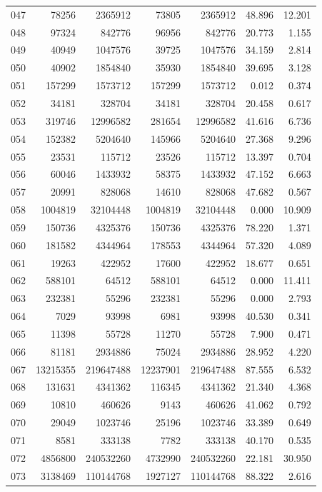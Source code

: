 \begin{longtable}{lrrrrrr}
047 & 78256 & 2365912 & 73805 & 2365912 & 48.896 & 12.201\\
048 & 97324 & 842776 & 96956 & 842776 & 20.773 & 1.155\\
049 & 40949 & 1047576 & 39725 & 1047576 & 34.159 & 2.814\\
050 & 40902 & 1854840 & 35930 & 1854840 & 39.695 & 3.128\\
051 & 157299 & 1573712 & 157299 & 1573712 & 0.012 & 0.374\\
052 & 34181 & 328704 & 34181 & 328704 & 20.458 & 0.617\\
053 & 319746 & 12996582 & 281654 & 12996582 & 41.616 & 6.736\\
054 & 152382 & 5204640 & 145966 & 5204640 & 27.368 & 9.296\\
055 & 23531 & 115712 & 23526 & 115712 & 13.397 & 0.704\\
056 & 60046 & 1433932 & 58375 & 1433932 & 47.152 & 6.663\\
057 & 20991 & 828068 & 14610 & 828068 & 47.682 & 0.567\\
058 & 1004819 & 32104448 & 1004819 & 32104448 & 0.000 & 10.909\\
059 & 150736 & 4325376 & 150736 & 4325376 & 78.220 & 1.371\\
060 & 181582 & 4344964 & 178553 & 4344964 & 57.320 & 4.089\\
061 & 19263 & 422952 & 17600 & 422952 & 18.677 & 0.651\\
062 & 588101 & 64512 & 588101 & 64512 & 0.000 & 11.411\\
063 & 232381 & 55296 & 232381 & 55296 & 0.000 & 2.793\\
064 & 7029 & 93998 & 6981 & 93998 & 40.530 & 0.341\\
065 & 11398 & 55728 & 11270 & 55728 & 7.900 & 0.471\\
066 & 81181 & 2934886 & 75024 & 2934886 & 28.952 & 4.220\\
067 & 13215355 & 219647488 & 12237901 & 219647488 & 87.555 & 6.532\\
068 & 131631 & 4341362 & 116345 & 4341362 & 21.340 & 4.368\\
069 & 10810 & 460626 & 9143 & 460626 & 41.062 & 0.792\\
070 & 29049 & 1023746 & 25196 & 1023746 & 33.389 & 0.649\\
071 & 8581 & 333138 & 7782 & 333138 & 40.170 & 0.535\\
072 & 4856800 & 240532260 & 4732990 & 240532260 & 22.181 & 30.950\\
073 & 3138469 & 110144768 & 1927127 & 110144768 & 88.322 & 2.616\\

\end{longtable}
